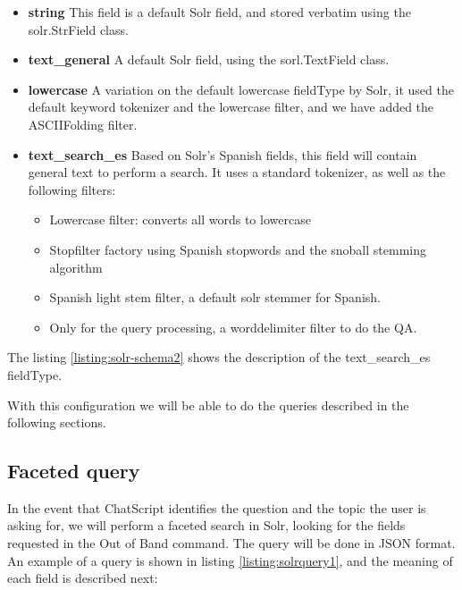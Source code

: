 \begin{itemize}
 \item \textbf{ string } This field is a default Solr field, and stored verbatim using the solr.StrField class.
 \item \textbf{ text\_general } A default Solr field, using the sorl.TextField class.
 \item \textbf{ lowercase } A variation on the default lowercase fieldType by Solr, it used the default keyword tokenizer and the lowercase filter, and we have added the ASCIIFolding filter.
 \item \textbf{ text\_search\_es } Based on Solr's Spanish fields, this field will contain general text to perform a search. It uses a standard tokenizer, as well as the following filters:
 \begin{itemize}
  \item Lowercase filter: converts all words to lowercase 
  \item Stopfilter factory using Spanish stopwords and the snoball stemming algorithm
  \item Spanish light stem filter, a default solr stemmer for Spanish.
  \item Only for the query processing, a worddelimiter filter to do the \ac{QA}.
 \end{itemize}
\end{itemize}

The listing \ref{listing:solr-schema2} shows the description of the text\_search\_es fieldType.

\begin{center}
  
\end{center}

With this configuration we will be able to do the queries described in the following sections.


\subsection{Faceted query}

In the event that ChatScript identifies the question and the topic the user is asking for, we will perform a faceted search in Solr, looking for the fields requested in the Out of Band command. The query will be done in JSON format. An example of a query is shown in listing \ref{listing:solrquery1}, and the meaning of each field is described next:

